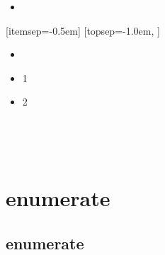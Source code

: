 			
			\begin{itemize}[topsep=0.0em,itemsep=0.0em]
			\item	
			\end{itemize}	


			[itemsep=-0.5em]
			[topsep=-1.0em,			]


			\begin{itemize}[	topsep=0.0em,itemsep=0.0em,
							leftmargin=4em, labelsep=3em ]
			\item	
			\end{itemize}	

			
		\def\TStart{	\setlength{\fboxsep}{12pt}
					\begin{boxedminipage}[c]{1.0\linewidth}
					\begin{itemize}[topsep=0.0em,itemsep=0.0em]
					}
		\def\TEnd{	\end{itemize}	
					\end{boxedminipage}\\
					}
		\TStart
		\item 1 
		\item 2 
		\TEnd

		\setlength{\fboxsep}{12pt}
		\begin{boxedminipage}[c]{1.0\linewidth}
		\end{boxedminipage}\\



	\chapter{enumerate}


	\section{enumerate}

